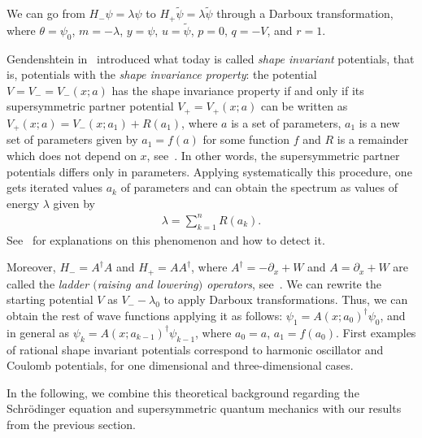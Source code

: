 \documentclass[10pt,a4paper]{amsart}
\numberwithin{equation}{section}
\begin{document}
We can go from $H_-\psi=\lambda\psi$ to $H_+\widetilde{\psi}=\lambda\widetilde{\psi}$ through a Darboux transformation, where $\theta=\psi_0$, $m=-\lambda$, $y=\psi$, $u=\widetilde{\psi}$, $p=0$, $q=-V$, and $r=1$.

Gendenshtein in~\cite{ge} introduced what today is called \emph{shape invariant} potentials, that is, potentials with the \emph{shape invariance property}: the potential $V=V_-=V_-(x;a)$ has the shape invariance property if and only if its supersymmetric partner potential $V_+=V_+(x;a)$ can be written as $V_+(x;a)=V_-(x;a_1)+R(a_1)$, where $a$ is a set of
parameters, $a_1$ is a new set of parameters given by $a_1=f(a)$ for some function $f$ and $R$ is a remainder which does not depend on $x$, see~\cite[Introduction and Section~4.3]{AP1}.
In other words, the supersymmetric partner potentials differs only in parameters. Applying systematically this procedure, one gets
iterated values $a_k$ of parameters and can obtain
the spectrum as values of energy $\lambda$ given by
\begin{gather*}
\lambda=\sum_{k=1}^n R(a_k).
\end{gather*}
See~\cite[Section~4.3]{AP1} for explanations on this phenomenon and how to detect it.


 Moreover, $H_-=A^\dag A$ and $H_+=A A^\dag$, where $A^\dag=-\partial_x+W$ and $A=\partial_x+W$ are called the \emph{ladder $($raising and lowering$)$ operators}, see~\cite{DKS}. We can rewrite the starting potential $V$ as ${V_--\lambda_0}$ to apply Darboux transformations. Thus, we can obtain the rest of wave functions applying it as follows: $\psi_1=A(x;a_0)^\dag\psi_0$, and in general as $\psi_k=A(x;a_{k-1})^\dag\psi_{k-1}$, where ${a_0=a}$, $a_1=f(a_0)$.
First examples of rational shape invariant potentials correspond to harmonic oscillator and Coulomb potentials, for one dimensional and three-dimensional cases.

In the following, we combine this theoretical background regarding the Schr\"odinger equation and supersymmetric quantum mechanics with our results from the previous section.
\end{document}
